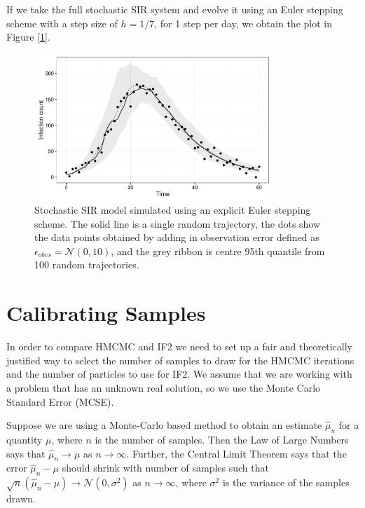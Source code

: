    If we take the full stochastic SIR system and evolve it using an Euler stepping scheme with a step size of $h = 1/7$, for 1 step per day, we obtain the plot in Figure [\ref{sirmean}].

    \begin{figure}
        \centering
        \captionsetup{width=.8\linewidth}
        \includegraphics[width=0.8\textwidth]{./images/sirmean.pdf}
        \caption{Stochastic SIR model simulated using an explicit Euler stepping scheme. The solid line is a single random trajectory, the dots show the data points obtained by adding in observation error defined as $\epsilon_{obvs} = \mathcal{N}(0,10)$, and the grey ribbon is centre 95th quantile from 100 random trajectories. \label{sirmean}}
    \end{figure}


\section{Calibrating Samples}

	In order to compare HMCMC and IF2 we need to set up a fair and theoretically justified way to select the number of samples to draw for the HMCMC iterations and the number of particles to use for IF2. We assume that we are working with a problem that has an unknown real solution, so we use the Monte Carlo Standard Error (MCSE).

	Suppose we are using a Monte-Carlo based method to obtain an estimate $\hat{\mu}_{n}$ for a quantity $\mu$, where $n$ is the number of samples. Then the Law of Large Numbers says that $\hat{\mu}_{n} \rightarrow \mu$ as $n \rightarrow \infty$. Further, the Central Limit Theorem says that the error $\hat{\mu}_{n} - \mu$ should shrink with number of samples such that $\sqrt{n} (\hat{\mu}_{n} - \mu) \rightarrow \mathcal{N}(0,\sigma^2)$ as $n \rightarrow \infty$, where $\sigma^2$ is the variance of the samples drawn.

